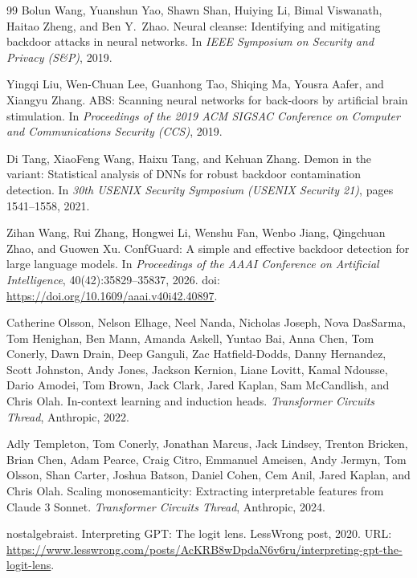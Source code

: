 \documentclass[11pt,letterpaper]{article}
\begin{document}
\begin{thebibliography}{99}
Bolun Wang, Yuanshun Yao, Shawn Shan, Huiying Li, Bimal Viswanath, Haitao Zheng, and Ben Y.\ Zhao.
\newblock Neural cleanse: Identifying and mitigating backdoor attacks in neural networks.
\newblock In \emph{IEEE Symposium on Security and Privacy (S\&P)}, 2019.

Yingqi Liu, Wen-Chuan Lee, Guanhong Tao, Shiqing Ma, Yousra Aafer, and Xiangyu Zhang.
\newblock ABS: Scanning neural networks for back-doors by artificial brain stimulation.
\newblock In \emph{Proceedings of the 2019 ACM SIGSAC Conference on Computer and Communications Security (CCS)}, 2019.

Di Tang, XiaoFeng Wang, Haixu Tang, and Kehuan Zhang.
\newblock Demon in the variant: Statistical analysis of {DNN}s for robust backdoor contamination detection.
\newblock In \emph{30th USENIX Security Symposium (USENIX Security 21)}, pages 1541--1558, 2021.

Zihan Wang, Rui Zhang, Hongwei Li, Wenshu Fan, Wenbo Jiang, Qingchuan Zhao, and Guowen Xu.
\newblock ConfGuard: A simple and effective backdoor detection for large language models.
\newblock In \emph{Proceedings of the AAAI Conference on Artificial Intelligence}, 40(42):35829--35837, 2026.
\newblock doi: \url{https://doi.org/10.1609/aaai.v40i42.40897}.

Catherine Olsson, Nelson Elhage, Neel Nanda, Nicholas Joseph, Nova DasSarma, Tom Henighan, Ben Mann, Amanda Askell, Yuntao Bai, Anna Chen, Tom Conerly, Dawn Drain, Deep Ganguli, Zac Hatfield-Dodds, Danny Hernandez, Scott Johnston, Andy Jones, Jackson Kernion, Liane Lovitt, Kamal Ndousse, Dario Amodei, Tom Brown, Jack Clark, Jared Kaplan, Sam McCandlish, and Chris Olah.
\newblock In-context learning and induction heads.
\newblock \emph{Transformer Circuits Thread}, Anthropic, 2022.

Adly Templeton, Tom Conerly, Jonathan Marcus, Jack Lindsey, Trenton Bricken, Brian Chen, Adam Pearce, Craig Citro, Emmanuel Ameisen, Andy Jermyn, Tom Olsson, Shan Carter, Joshua Batson, Daniel Cohen, Cem Anil, Jared Kaplan, and Chris Olah.
\newblock Scaling monosemanticity: Extracting interpretable features from {Claude 3 Sonnet}.
\newblock \emph{Transformer Circuits Thread}, Anthropic, 2024.

nostalgebraist.
\newblock Interpreting {GPT}: The logit lens.
\newblock LessWrong post, 2020.
\newblock URL: \url{https://www.lesswrong.com/posts/AcKRB8wDpdaN6v6ru/interpreting-gpt-the-logit-lens}.


\end{thebibliography}
\end{document}

